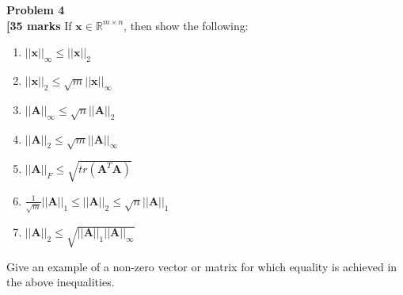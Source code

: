 \documentclass[fleqn]{article}
\newenvironment{problem}[2][Problem]
    { \begin{mdframed}[backgroundcolor=gray!20] \textbf{#1 #2} \\}
    {  \end{mdframed}}
\begin{document}
\newpage
\begin{problem}{4}
\textbf{[35 marks} If $\textbf{x} \in \mathbb{R}^{m \times n}$, then show the following:
\begin{enumerate}[label=(\alph*)]
    \item $||\textbf{x}||_{\infty} \leq ||\textbf{x}||_{2}$
    \item $||\textbf{x}||_{2} \leq \sqrt{m}||\textbf{x}||_{\infty}$
    \item $||\textbf{A}||_{\infty} \leq \sqrt{n}||\textbf{A}||_{2}$
    \item $||\textbf{A}||_{2} \leq \sqrt{m}||\textbf{A}||_{\infty}$
    \item $||\textbf{A}||_{F} \leq \sqrt{tr(\textbf{A}^T\textbf{A})}$
    \item $\frac{1}{\sqrt{m}} || \textbf{A}||_1 \leq || \textbf{A}||_2 \leq \sqrt{n}|| \textbf{A} ||_1$
    \item $|| \textbf{A}||_2 \leq \sqrt{|| \textbf{A}||_1 || \textbf{A}||_{\infty}}$
\end{enumerate}
    Give an example of a non-zero vector or matrix for which equality is achieved in the above inequalities.
\end{problem}
\end{document}
